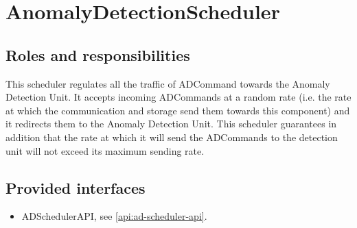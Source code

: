 \section{AnomalyDetectionScheduler}
\label{element:ad-scheduler}

\subsection{Roles and responsibilities}

\npar This scheduler regulates all the traffic of ADCommand towards the
Anomaly Detection Unit. It accepts incoming ADCommands at a random rate (i.e.
the rate at which the communication and storage send them towards this
component) and it redirects them to the Anomaly Detection Unit. This
scheduler guarantees in addition that the rate at which it will send the
ADCommands to the detection unit will not exceed its maximum sending rate.

\subsection{Provided interfaces}

\begin{itemize}
  \item ADSchedulerAPI, see \ref{api:ad-scheduler-api}.
\end{itemize}




